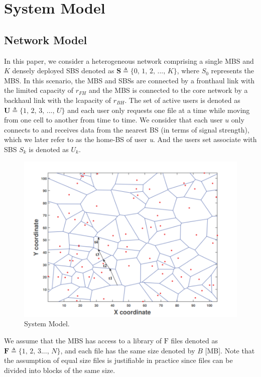 \documentclass[conference]{IEEEtran}
\begin{document}
\section{System Model}
\subsection{Network Model}
In this paper, we consider a heterogeneous network comprising a single MBS and $K$ densely deployed SBS denoted as $\mathbf{S} \triangleq\{0\mathrm{,\,}1\mathrm{,\,}2\mathrm{,\,}...\mathrm{,\,}K\}$, where $S_0$ represents the MBS. In this scenario, the MBS and SBSs are connected by a fronthaul link with the limited capacity of $r_{FH}$ and the MBS is connected to the core network by a backhaul link with the lcapacity of $ r_{BH}$. The set of active users is denoted as $\mathbf{U} \triangleq\{1\mathrm{,\,}2\mathrm{,\,}3\mathrm{,\,}...\mathrm{,\,}U\}$ and each user only requests one file at a time while moving from one cell to another from time to time. We consider that each user $u$ only connects to and receives data from the nearest BS (in terms of signal strength), which we later refer to as the  home-BS of user \emph{u}. And the users set associate with SBS $S_k$ is denoted as $U_k$.

\begin{figure}[htbp]
 \centerline{\includegraphics[scale=1]{fig1.png}}
 \caption{System Model.}
 \label{fig 1}
\end{figure}

We assume that the MBS has access to a library of $\mathrm{F}$ files denoted as $\mathbf{F} \triangleq\{1\mathrm{,\,}2\mathrm{,\,}3...\mathrm{,\,}N\}$, and each file has the same size denoted by $B$ [MB]. Note that the assumption of equal size files is justifiable in practice since files can be divided into blocks of the same size.
\end{document}
